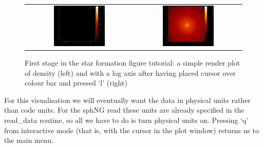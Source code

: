 \documentclass[a4paper,10pt]{article}
\begin{document}
\begin{figure}[h]
\begin{center}
\begin{tabular}{cc}
\includegraphics[width=0.5\textwidth]{starpart1.png} &
\includegraphics[width=0.5\textwidth]{starpart2.png}
\end{tabular}
\caption{First stage in the star formation figure tutorial: a simple render plot of density (left) and with a log axis after having placed cursor over colour bar and pressed `l' (right)}
\label{fig:starpart1}
\end{center}
\end{figure}
For this visualisation we will eventually want the data in physical units rather than code units. For the sphNG read these units are already specified in the read\_data routine, so all we have to do is turn physical units on. Pressing `q' from interactive mode (that is, with the cursor in the plot window) returns us to the main menu.
\end{document}
